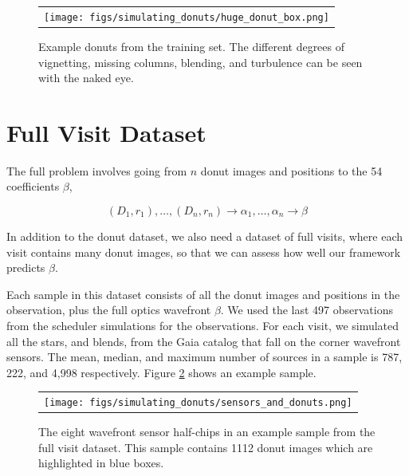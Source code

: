 \begin{figure} [!htbp]
\begin{center}
\begin{tabular}{c}
\texttt{[image: figs/simulating\_donuts/huge\_donut\_box.png]}
\end{tabular}
\end{center}
\caption[Example Donuts from Donut Dataset]{Example donuts from the training set. The different degrees of vignetting, missing columns, blending, and turbulence can be seen with the naked eye.\label{fig:donutbox}}
\end{figure}

\section{Full Visit Dataset}

The full problem involves going from $n$ donut images and positions to the 54 coefficients $\beta$,

\begin{equation}\label{eqn:blackbody}
(D_1,r_1), \dots, (D_n, r_n) \to \alpha_1, \dots, \alpha_n \to \beta
\end{equation}

\noindent In addition to the donut dataset, we also need a dataset of full visits, where each visit contains many donut images, so that we can assess how well our framework predicts $\beta$.

Each sample in this dataset consists of all the donut images and positions in the observation, plus the full optics wavefront $\beta$. We used the last 497 observations from the scheduler simulations for the observations. For each visit, we simulated all the stars, and blends, from the Gaia catalog that fall on the corner wavefront sensors. The mean, median, and maximum number of sources in a sample is 787, 222, and 4,998 respectively. Figure \ref{fig:sensordonut} shows an example sample.

\begin{figure} [!htbp]
\begin{center}
\begin{tabular}{c}
\texttt{[image: figs/simulating\_donuts/sensors\_and\_donuts.png]}
\end{tabular}
\end{center}
\caption[Example Full Visit Sample]{The eight wavefront sensor half-chips in an example sample from the full visit dataset. This sample contains 1112 donut images which are highlighted in blue boxes. \label{fig:sensordonut}}
\end{figure}

